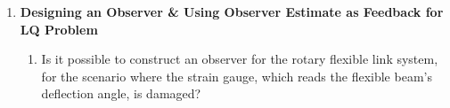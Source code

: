 \begin{enumerate}
    \item \textbf{Designing an Observer \& Using Observer Estimate as Feedback for LQ Problem}\label{section:lab4_observer_lqr}
          \begin{enumerate}
              \item Is it possible to construct an observer for the rotary flexible link system, for the scenario where the strain gauge, which reads the flexible beam's deflection angle, is damaged?
          \end{enumerate}


\end{enumerate}

